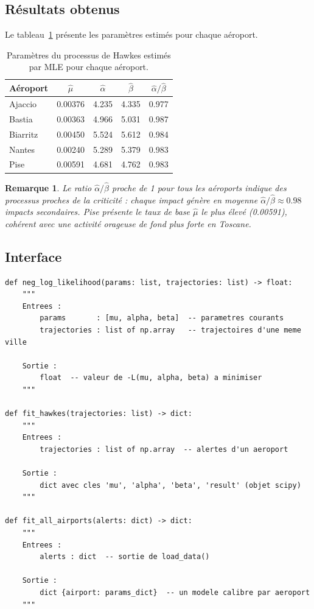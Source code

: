 \documentclass[a4paper,11pt]{article}
\newtheorem{remarque}{Remarque}[section]
\begin{document}
\subsection{Résultats obtenus}

Le tableau~\ref{tab:params} présente les paramètres estimés pour chaque aéroport.

\begin{table}[H]
\centering
\begin{tabular}{lcccc}
\toprule
Aéroport & $\hat\mu$ & $\hat\alpha$ & $\hat\beta$ & $\hat\alpha/\hat\beta$ \\
\midrule
Ajaccio  & 0.00376 & 4.235 & 4.335 & 0.977 \\
Bastia   & 0.00363 & 4.966 & 5.031 & 0.987 \\
Biarritz & 0.00450 & 5.524 & 5.612 & 0.984 \\
Nantes   & 0.00240 & 5.289 & 5.379 & 0.983 \\
Pise     & 0.00591 & 4.681 & 4.762 & 0.983 \\
\bottomrule
\end{tabular}
\caption{Paramètres du processus de Hawkes estimés par MLE pour chaque aéroport.}
\label{tab:params}
\end{table}

\begin{remarque}
Le ratio $\hat\alpha/\hat\beta$ proche de 1 pour tous les aéroports indique des processus proches de la criticité : chaque impact génère en moyenne $\hat\alpha/\hat\beta \approx 0.98$ impacts secondaires. Pise présente le taux de base $\hat\mu$ le plus élevé (0.00591), cohérent avec une activité orageuse de fond plus forte en Toscane.
\end{remarque}

\subsection{Interface}

\begin{lstlisting}
def neg_log_likelihood(params: list, trajectories: list) -> float:
    """
    Entrees :
        params       : [mu, alpha, beta]  -- parametres courants
        trajectories : list of np.array   -- trajectoires d'une meme ville

    Sortie :
        float  -- valeur de -L(mu, alpha, beta) a minimiser
    """

def fit_hawkes(trajectories: list) -> dict:
    """
    Entrees :
        trajectories : list of np.array  -- alertes d'un aeroport

    Sortie :
        dict avec cles 'mu', 'alpha', 'beta', 'result' (objet scipy)
    """

def fit_all_airports(alerts: dict) -> dict:
    """
    Entrees :
        alerts : dict  -- sortie de load_data()

    Sortie :
        dict {airport: params_dict}  -- un modele calibre par aeroport
    """
\end{lstlisting}
\end{document}
